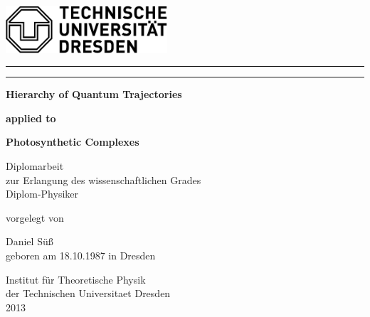 \thispagestyle{empty}
\vspace{-5em}
\begin{flushleft}
  \includegraphics[angle=0,width=60mm]{TU_Logo_SW.pdf}
  \par
\end{flushleft}
\vspace{-3em}
\begin{center}\rule{\textwidth}{0.1ex}\par\end{center}
\vspace{-4em}
\begin{center}\rule{\textwidth}{0.1ex}\par\end{center}

\vfill
\begin{center}\textbf{\Huge Hierarchy of Quantum Trajectories}\par\end{center}
\begin{center}\textbf{\Huge applied to}\par\end{center}
\begin{center}\textbf{\Huge Photosynthetic Complexes}\par\end{center}
\vfill
\begin{center}
{\large Diplomarbeit}\\
{\large zur Erlangung des wissenschaftlichen Grades}\\
{\large Diplom-Physiker}\par
\end{center}

\begin{center}vorgelegt von\par\end{center}
\begin{center}{\large Daniel Süß}\\geboren am 18.10.1987 in
Dresden\par
\end{center}
\vspace{13mm}
\begin{center}
{\large Institut für Theoretische Physik}\\
{\large der Technischen Universitaet Dresden}\\
{\large 2013}\par
\end{center}


